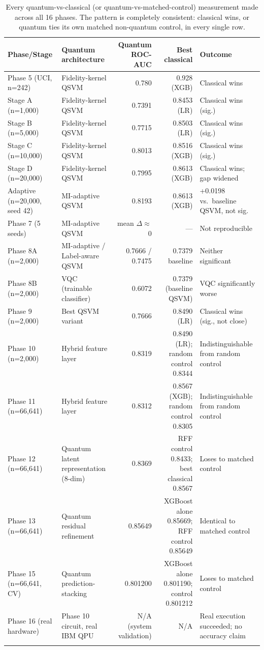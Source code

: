 \documentclass[11pt,a4paper]{article}
\begin{document}
\begin{longtable}{@{}p{2.6cm}p{3.6cm}rrl@{}}
\toprule
\textbf{Phase/Stage} & \textbf{Quantum architecture} & \textbf{Quantum ROC-AUC} & \textbf{Best classical} & \textbf{Outcome} \\
\midrule
\endhead
Phase 5 (UCI, n=242) & Fidelity-kernel QSVM & 0.780 & 0.928 (XGB) & Classical wins \\
Stage A (n=1,000) & Fidelity-kernel QSVM & 0.7391 & 0.8453 (LR) & Classical wins (sig.) \\
Stage B (n=5,000) & Fidelity-kernel QSVM & 0.7715 & 0.8503 (LR) & Classical wins (sig.) \\
Stage C (n=10,000) & Fidelity-kernel QSVM & 0.8013 & 0.8516 (XGB) & Classical wins (sig.) \\
Stage D (n=20,000) & Fidelity-kernel QSVM & 0.7995 & 0.8613 (XGB) & Classical wins; gap widened \\
Adaptive (n=20,000, seed 42) & MI-adaptive QSVM & 0.8193 & 0.8613 (XGB) & +0.0198 vs.\ baseline QSVM, not sig. \\
Phase 7 (5 seeds) & MI-adaptive QSVM & mean $\Delta\approx$0 & --- & Not reproducible \\
Phase 8A (n=2,000) & MI-adaptive / Label-aware QSVM & 0.7666 / 0.7475 & 0.7379 baseline & Neither significant \\
Phase 8B (n=2,000) & VQC (trainable classifier) & 0.6072 & 0.7379 (baseline QSVM) & VQC significantly worse \\
Phase 9 (n=2,000) & Best QSVM variant & 0.7666 & 0.8490 (LR) & Classical wins (sig., not close) \\
Phase 10 (n=2,000) & Hybrid feature layer & 0.8319 & 0.8490 (LR); random control 0.8344 & Indistinguishable from random control \\
Phase 11 (n=66,641) & Hybrid feature layer & 0.8312 & 0.8567 (XGB); random control 0.8305 & Indistinguishable from random control \\
Phase 12 (n=66,641) & Quantum latent representation (8-dim) & 0.8369 & RFF control 0.8433; best classical 0.8567 & Loses to matched control \\
Phase 13 (n=66,641) & Quantum residual refinement & 0.85649 & XGBoost alone 0.85669; RFF control 0.85649 & Identical to matched control \\
Phase 15 (n=66,641, CV) & Quantum prediction-stacking & 0.801200 & XGBoost alone 0.801190; control 0.801212 & Loses to matched control \\
Phase 16 (real hardware) & Phase 10 circuit, real IBM QPU & N/A (system validation) & N/A & Real execution succeeded; no accuracy claim \\
\bottomrule
\caption{Every quantum-vs-classical (or quantum-vs-matched-control) measurement made across all 16 phases. The pattern is completely consistent: classical wins, or quantum ties its own matched non-quantum control, in every single row.}
\end{longtable}
\end{document}
